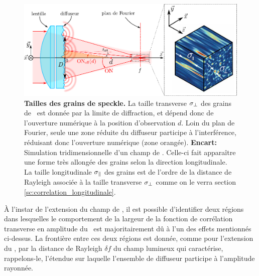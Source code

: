 \begin{figure}
\centering
\includegraphics[width=\textwidth]{Fig/Speckle/correlation_speckle.pdf}
\caption{\textbf{Tailles des grains de speckle.} La taille transverse $\sigma_{\perp}$ des grains de \speckle\ est donnée par la limite de diffraction, et dépend donc de l'ouverture numérique à la position d'observation $d$. Loin du plan de Fourier, seule une zone réduite du diffuseur participe à l'interférence, réduisant donc l'ouverture numérique (zone orangée). \textbf{Encart:} Simulation tridimensionnelle d'un champ de \speckle . Celle-ci fait apparaître une forme très allongée des grains selon la direction longitudinale. La taille longitudinale $\sigma_{\parallel}$ des grains est de l'ordre de la distance de Rayleigh associée à la taille transverse $\sigma_{\perp}$ comme on le verra section \ref{sc:correlation_longitudinale}.}
\label{fig:correlation_speckle}
\end{figure}

À l'instar de l'extension du champ de \speckle , il est possible d'identifier deux régions dans lesquelles le comportement de la largeur de la fonction de corrélation transverse en amplitude du \speckle\ est majoritairement dû à l'un des effets mentionnés ci-dessus. La frontière entre ces deux régions est donnée, comme pour l'extension du \speckle , par la distance de Rayleigh $\delta f$ du champ lumineux qui caractérise, rappelons-le, l'étendue sur laquelle l'ensemble de diffuseur participe à l'amplitude rayonnée.

